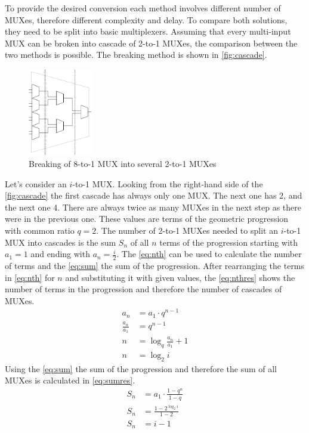 To provide the desired conversion each method involves different number of MUXes, therefore different complexity and delay. To compare both solutions, they need to be split into basic multiplexers. Assuming that every multi-input MUX can be broken into cascade of 2-to-1 MUXes, the comparison between the two methods is possible. The breaking method is shown in \autoref{fig:cascade}.

\begin{figure}[h]
\centering
\includegraphics[width=0.25\textwidth]{figures/cascade.png}
\caption{Breaking of 8-to-1 MUX into several 2-to-1 MUXes}
\label{fig:cascade}
\end{figure}

Let's consider an $i$-to-1 MUX. Looking from the right-hand side of the \autoref{fig:cascade} the first cascade has always only one MUX. The next one has 2, and the next one 4. There are always twice as many MUXes in the next step as there were in the previous one. These values are terms of the geometric progression with common ratio $q=2$. The number of 2-to-1 MUXes needed to split an $i$-to-1 MUX into cascades is the sum $S_n$ of all $n$ terms of the progression starting with $a_1=1$ and ending with $a_n=\frac{i}{2}$. The \autoref{eq:nth} can be used to calculate the number of terms and the \autoref{eq:sum} the sum of the progression. After rearranging the terms in \autoref{eq:nth} for $n$ and substituting it with given values, the \autoref{eq:nthres} shows the number of terms in the progression and therefore the number of cascades of MUXes.
\begin{subequations}
\begin{align}
    a_n&=a_1\cdot q^{n-1}\label{eq:nth}\\
    \frac{a_n}{a_1} &=  q^{n-1}\\
    n &= \log_q \frac{a_n}{a_1}+1\\
    n &= \log_2 i\label{eq:nthres}
\end{align}
\end{subequations}
Using the \autoref{eq:sum} the sum of the progression and therefore the sum of all MUXes is calculated in \autoref{eq:sumres}.
\begin{subequations}
\begin{align}
    S_n&=a_1\cdot\frac{1-q^{n}}{1-q}\label{eq:sum}\\
    S_n&=\frac{1-2^{\log_2 i}}{1-2}\\
    S_n&=i-1\label{eq:sumres}
\end{align}
\end{subequations}

